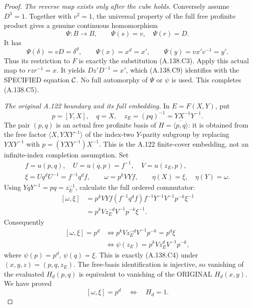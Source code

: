 \begin{proof}
\par\smallskip\noindent
\emph{The reverse map exists only after the cube holds.}
Conversely assume \(D^3=1\). Together with \(v^2=1\),
the universal property of the full free profinite product
gives a genuine continuous homomorphism
\[
 \Psi:B\longrightarrow B,\qquad
 \Psi(s)=v,\quad\Psi(r)=D .
\]
It has
\[
 \Psi(\delta)=vD=\delta^d,\qquad
 \Psi(x)=x^d=x',\qquad
 \Psi(y)=vx'v^{-1}=y' .
\tag{A.138.C11}
\]
Thus its restriction to \(F\) is exactly the substitution
(A.138.C3). Apply this actual map to \(rzr^{-1}=x\).
It yields \(Dz'D^{-1}=x'\), which (A.138.C9) identifies
with the SPECIFIED equation \({\cal C}\).
No full automorphy of \(\Psi\) or \(\psi\) is used.
This completes (A.138.C5).

\par\smallskip\noindent
\emph{The original A.122 boundary and its full embedding.}
In \(E=\widehat F(X,Y)\), put
\[
 p=[Y,X],\quad q=X,\quad z_E=(pq)^{-1}=YX^{-1}Y^{-1}.
\]
The pair \((p,q)\) is an actual free profinite basis of
\(H=\overline{\langle p,q\rangle}\): it is obtained from
the free factor \(\langle X,YXY^{-1}\rangle\) of the
index-two \(Y\)-parity subgroup by replacing
\(YXY^{-1}\) with \(p=(YXY^{-1})X^{-1}\).
This is the A.122 finite-cover embedding, not an
infinite-index completion assumption.
Set
\[
\begin{gathered}
 f=u(p,q),\quad U=u(q,p)=f^{-1},\quad V=u(z_E,p),\\
 \xi=Uq^dU^{-1}=f^{-1}q^df,\qquad
 \omega=p^kVYf,\qquad
 \eta(X)=\xi,\quad\eta(Y)=\omega .
\end{gathered}
\tag{A.138.C12}
\]
Using \(YqY^{-1}=pq=z_E^{-1}\), calculate the full
ordered commutator:
\[
\begin{aligned}
 [\omega,\xi]
 &=p^kVYf(f^{-1}q^df)f^{-1}Y^{-1}V^{-1}p^{-k}\xi^{-1}\\
 &=p^kVz_E^{-d}V^{-1}p^{-k}\xi^{-1}.
\end{aligned}
\tag{A.138.C13}
\]
Consequently
\[
\begin{aligned}
 [\omega,\xi]=p^d
 &\Longleftrightarrow
 p^kVz_E^{-d}V^{-1}p^{-k}=p^d\xi\\
 &\Longleftrightarrow
 \psi(z_E)=p^kVz_E^dV^{-1}p^{-k},
\end{aligned}
\tag{A.138.C14}
\]
where \(\psi(p)=p^d\), \(\psi(q)=\xi\).
This is exactly (A.138.C4) under
\((x,y,z)=(p,q,z_E)\).
The free-basis identification is injective, so vanishing
of the evaluated \(H_d(p,q)\) is equivalent to vanishing
of the ORIGINAL \(H_d(x,y)\). We have proved
\[
                    [\omega,\xi]=p^d
                       \quad\Longleftrightarrow\quad H_d=1 .
\tag{A.138.C15}
\]


\end{proof}
